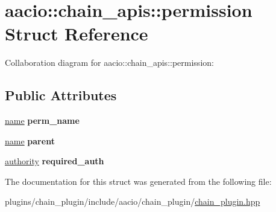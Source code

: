 \hypertarget{structaacio_1_1chain__apis_1_1permission}{}\section{aacio\+:\+:chain\+\_\+apis\+:\+:permission Struct Reference}
\label{structaacio_1_1chain__apis_1_1permission}


Collaboration diagram for aacio\+:\+:chain\+\_\+apis\+:\+:permission\+:
\subsection*{Public Attributes}
\begin{DoxyCompactItemize}
\item 
\mbox{\label{structaacio_1_1chain__apis_1_1permission_a5d465841947ac827831c5f5539e249ac}} 
\mbox{\hyperlink{structaacio_1_1name}{name}} {\bfseries perm\+\_\+name}
\item 
\mbox{\label{structaacio_1_1chain__apis_1_1permission_abd52f9ce9306d476985a6255f6814b1f}} 
\mbox{\hyperlink{structaacio_1_1name}{name}} {\bfseries parent}
\item 
\mbox{\label{structaacio_1_1chain__apis_1_1permission_a0d50ec0eb3d6d3041ec526ff7d0364d7}} 
\mbox{\hyperlink{structaacio_1_1chain_1_1authority}{authority}} {\bfseries required\+\_\+auth}
\end{DoxyCompactItemize}


The documentation for this struct was generated from the following file\+:\begin{DoxyCompactItemize}
\item 
plugins/chain\+\_\+plugin/include/aacio/chain\+\_\+plugin/\mbox{\hyperlink{chain__plugin_8hpp}{chain\+\_\+plugin.\+hpp}}\end{DoxyCompactItemize}
